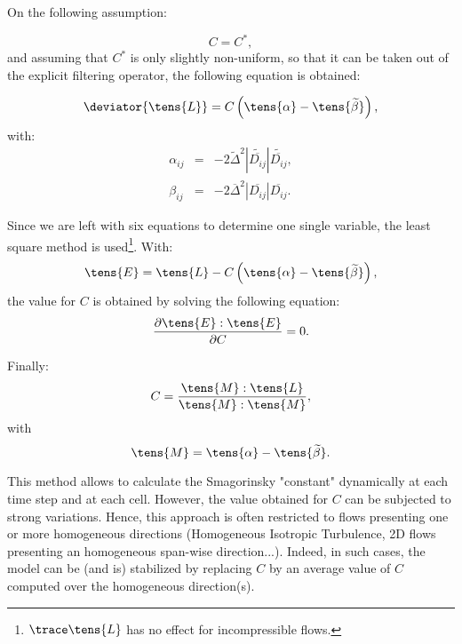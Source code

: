 On the following assumption:

\begin{equation}
C = C^*,
\end{equation}
and assuming that $C^*$ is only slightly non-uniform, so that it can be
taken out of the explicit filtering operator, the following equation is
obtained:

\begin{equation}
\deviator{\tens{L}} =  C \left(
\tens{ \alpha}- \tens{\widetilde{\beta}} \right),
\end{equation}
with:
\begin{equation}
\begin{array}{rcl}
\alpha_{ij} &=& -2 \widetilde{\Delta}^2 |\widetilde{\overline{D_{ij}}}|
\widetilde{\overline{D_{ij}}} , \\
\beta_{ij} &=& -2 \overline{\Delta}^2 |\overline{D_{ij}}| \overline{D_{ij}}.
\end{array}
\end{equation}

Since we are left with six equations to determine one single variable, the
least square method is used\footnote{
$\trace \tens{L}$ has no effect for
incompressible flows.}. With:
\begin{equation}
\tens{E} = \tens{L}-C \left( \tens{\alpha} - \tens{\widetilde{\beta}} \right),
\end{equation}
the value for $C$ is obtained by solving the following equation:
\begin{equation}
\frac{\partial \tens{E} : \tens{E}}{\partial C} = 0.
\end{equation}

Finally:
\begin{equation}
C = \frac{ \tens{M} : \tens{L} }{ \tens{M} : \tens{M}},
\end{equation}
with
\begin{equation}
\tens{M} = \tens{\alpha} - \tens{\widetilde{\beta}}.
\end{equation}

This method allows to calculate the Smagorinsky "constant" dynamically at
each time step and at each cell. However, the value obtained for $C$ can be
subjected to strong variations. Hence, this approach is often restricted to
flows presenting one or more homogeneous directions (Homogeneous Isotropic
Turbulence, 2D flows presenting an homogeneous span-wise direction...).
Indeed, in such cases, the model can be (and is) stabilized by replacing $C$
by an average value of $C$ computed over the homogeneous direction(s).


